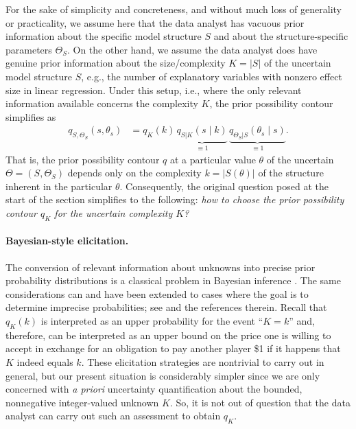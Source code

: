 \documentclass[12pt]{article}
\begin{document}
For the sake of simplicity and concreteness, and without much loss of generality or practicality, we assume here that the data analyst has vacuous prior information about the specific model structure $S$ and about the structure-specific parameters $\Theta_S$.  On the other hand, we assume the data analyst does have genuine prior information about the size/complexity $K=|S|$ of the uncertain model structure $S$, e.g., the number of explanatory variables with nonzero effect size in linear regression.  Under this setup, i.e., where the only relevant information available concerns the complexity $K$, the prior possibility contour simplifies as 
\begin{align*}
q_{S,\Theta_S}(s,\theta_s) %
& = q_K(k) \, \underbrace{q_{S|K}(s \mid k)}_{\equiv 1} \, \underbrace{q_{\Theta_S|S}(\theta_s \mid s)}_{\equiv 1}.
\end{align*} 
That is, the prior possibility contour $q$ at a particular value $\theta$ of the uncertain $\Theta=(S,\Theta_S)$ depends only on the complexity $k = |S(\theta)|$ of the structure inherent in the particular $\theta$.  Consequently, the original question posed at the start of the section simplifies to the following: {\em how to choose the prior possibility contour $q_K$ for the uncertain complexity $K$?} 

\paragraph{Bayesian-style elicitation.} 
The conversion of relevant information about unknowns into precise prior probability distributions is a classical problem in Bayesian inference \citep[e.g.,][]{kass1995bayes, ohagan2004advanced, gelman2020holes, mikkola.etal.2024}.  The same considerations can and have been extended to cases where the goal is to determine imprecise probabilities; see \citet{smithson2014elicitation} and the references therein.  Recall that $q_K(k)$ is interpreted as an upper probability for the event ``$K=k$'' and, therefore, can be interpreted as an upper bound on the price one is willing to accept in exchange for an obligation to pay another player \$1 if it happens that $K$ indeed equals $k$.  These elicitation strategies are nontrivial to carry out in general, but our present situation is considerably simpler since we are only concerned with {\em a priori} uncertainty quantification about the bounded, nonnegative integer-valued unknown $K$.  So, it is not out of question that the data analyst can carry out such an assessment to obtain $q_K$.  
\end{document}
